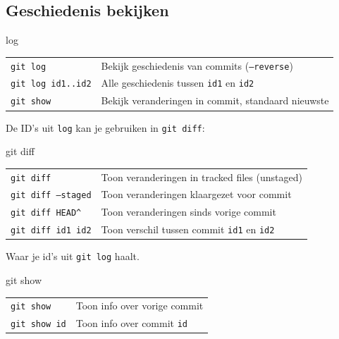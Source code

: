 \subsection{Geschiedenis bekijken}
\begin{frame}{log}
	\begin{tabular}{ll}
		\texttt{git log}& Bekijk geschiedenis van commits (\texttt{--reverse})\\
		\texttt{git log id1..id2} & Alle geschiedenis tussen \texttt{id1} en \texttt{id2}\\
		\texttt{git show}& Bekijk veranderingen in commit, standaard nieuwste
	\end{tabular}

	De ID's uit \texttt{log} kan je gebruiken in \texttt{git diff}:
\end{frame}

\begin{frame}{git diff}
	\begin{tabular}{ll}
		\texttt{git diff}&Toon veranderingen in tracked files (unstaged)\\
		\texttt{git diff --staged}&Toon veranderingen klaargezet voor commit\\
		\texttt{git diff HEAD\^}&Toon veranderingen sinds vorige commit\\
		\texttt{git diff id1 id2}&Toon verschil tussen commit \texttt{id1} en \texttt{id2}
	\end{tabular}
	{\footnotesize Waar je id's uit \texttt{git log} haalt. }
\end{frame}

\begin{frame}{git show}
	\begin{tabular}{l l}
		\texttt{git show}&Toon info over vorige commit\\
		\texttt{git show id}&Toon info over commit \texttt{id}\\
	\end{tabular}
\end{frame}


